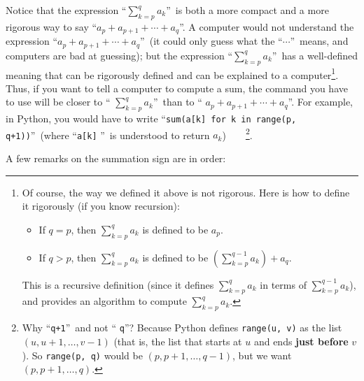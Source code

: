 \documentclass[numbers=enddot,12pt,final,onecolumn,notitlepage]{scrartcl}%
\theoremstyle{definition}
\let\sumnonlimits\sum
\renewcommand{\sum}{\sumnonlimits\limits}
\begin{document}
Notice that the expression \textquotedblleft$\sum_{k=p}^{q}a_{k}%
$\textquotedblright\ is both a more compact and a more rigorous way to say
\textquotedblleft$a_{p}+a_{p+1}+\cdots+a_{q}$\textquotedblright. A computer
would not understand the expression \textquotedblleft$a_{p}+a_{p+1}%
+\cdots+a_{q}$\textquotedblright\ (it could only guess what the
\textquotedblleft$\cdots$\textquotedblright\ means, and computers are bad at
guessing); but the expression \textquotedblleft$\sum_{k=p}^{q}a_{k}%
$\textquotedblright\ has a well-defined meaning that can be rigorously defined
and can be explained to a computer\footnote{Of course, the way we defined it
above is not rigorous. Here is how to define it rigorously (if you know
recursion):
\par
\begin{itemize}
\item If $q=p$, then $\sum_{k=p}^{q}a_{k}$ is defined to be $a_{p}$.
\par
\item If $q>p$, then $\sum_{k=p}^{q}a_{k}$ is defined to be $\left(
\sum_{k=p}^{q-1}a_{k}\right)  +a_{q}$.
\end{itemize}
\par
This is a recursive definition (since it defines $\sum_{k=p}^{q}a_{k}$ in
terms of $\sum_{k=p}^{q-1}a_{k}$), and provides an algorithm to compute
$\sum_{k=p}^{q}a_{k}$.}. Thus, if you want to tell a computer to compute a
sum, the command you have to use will be closer to \textquotedblleft%
$\sum_{k=p}^{q}a_{k}$\textquotedblright\ than to \textquotedblleft%
$a_{p}+a_{p+1}+\cdots+a_{q}$\textquotedblright. For example, in Python, you
would have to write \textquotedblleft\texttt{sum(a[k] for k in range(p,
q+1))}\textquotedblright\ (where \textquotedblleft\texttt{a[k]}%
\textquotedblright\ is understood to return $a_{k}$)\ \ \ \ \footnote{Why
\textquotedblleft\texttt{q+1}\textquotedblright\ and not \textquotedblleft%
\texttt{q}\textquotedblright? Because Python defines \texttt{range(u, v)} as
the list $\left(  u,u+1,\ldots,v-1\right)  $ (that is, the list that starts at
$u$ and ends \textbf{just before} $v$). So \texttt{range(p, q)} would be
$\left(  p,p+1,\ldots,q-1\right)  $, but we want $\left(  p,p+1,\ldots
,q\right)  $.}.

A few remarks on the summation sign are in order:
\end{document}
